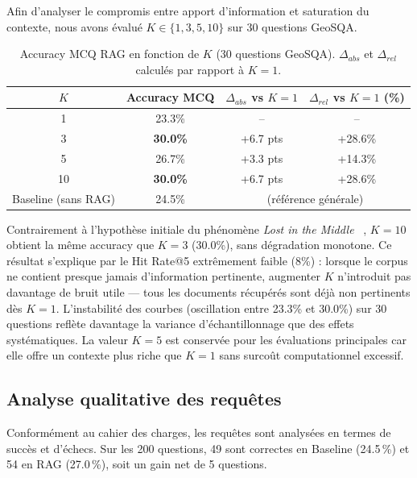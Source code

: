 \documentclass[12pt,a4paper]{article}
\begin{document}
Afin d'analyser le compromis entre apport d'information et saturation du contexte, nous avons évalué $K \in \{1, 3, 5, 10\}$ sur 30 questions GeoSQA.

\begin{table}[H]
\centering
\caption{Accuracy MCQ RAG en fonction de $K$ (30 questions GeoSQA). 
$\Delta_{abs}$ et $\Delta_{rel}$ calculés par rapport à $K = 1$.}
\label{tab:impact_k}
\begin{tabular}{cccc}
\toprule
$K$ & \textbf{Accuracy MCQ} & $\Delta_{abs}$ vs $K=1$ & 
$\Delta_{rel}$ vs $K=1$ (\%) \\
\midrule
1  & 23.3\% & --       & --      \\
3  & \textbf{30.0\%} & +6.7 pts & +28.6\% \\
5  & 26.7\% & +3.3 pts & +14.3\% \\
10 & \textbf{30.0\%} & +6.7 pts & +28.6\% \\
\midrule
Baseline (sans RAG) & 24.5\% & \multicolumn{2}{c}{(référence générale)} \\
\bottomrule
\end{tabular}
\end{table}

Contrairement à l'hypothèse initiale du phénomène \textit{Lost in the Middle} ~\cite{liu2023lost}, $K = 10$ obtient la même accuracy que $K = 3$ (30.0\%), 
sans dégradation monotone. Ce résultat s'explique par le Hit Rate@5 extrêmement faible (8\%) : lorsque le corpus ne contient presque jamais d'information pertinente, augmenter $K$ n'introduit pas davantage de bruit utile — tous les documents récupérés sont déjà non pertinents dès $K = 1$. 
L'instabilité des courbes (oscillation entre 23.3\% et 30.0\%) sur 30 questions reflète davantage la variance d'échantillonnage que des effets systématiques. 
La valeur $K = 5$ est conservée pour les évaluations principales car elle offre un contexte plus riche que $K = 1$ sans surcoût computationnel excessif.


\subsection{Analyse qualitative des requ\^etes}

Conform\'ement au cahier des charges, les requ\^etes sont analys\'ees en termes de succ\`es et d'\'echecs. Sur les 200 questions, 49 sont correctes en Baseline (24.5\,\%) et 54 en RAG (27.0\,\%), soit un gain net de 5 questions.
\end{document}
